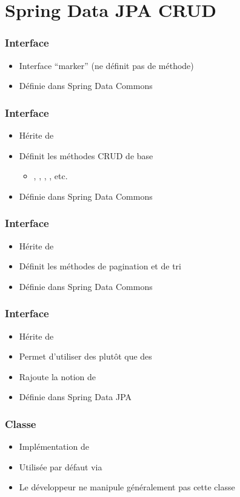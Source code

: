 \section{Spring Data JPA CRUD}



\begin{frame}
 \frametitle{Interface }
 \begin{itemize}
  \item Interface ``marker'' (ne définit pas de méthode)
  \item Définie dans Spring Data Commons
 \end{itemize}

\end{frame}

\begin{frame}
 \frametitle{Interface }
 \begin{itemize}
  \item Hérite de 
  \item Définit les méthodes CRUD de base
  \begin{itemize}
   \item {}, , , , etc.
  \end{itemize}
  \item Définie dans Spring Data Commons
 \end{itemize}

\end{frame}

\begin{frame}
 \frametitle{Interface }
 \begin{itemize}
  \item Hérite de 
  \item Définit les méthodes de pagination et de tri
  \item Définie dans Spring Data Commons
 \end{itemize}

\end{frame}

\begin{frame}
 \frametitle{Interface }
 \begin{itemize}
  \item Hérite de 
  \item Permet d'utiliser des  plutôt que des 
  \item Rajoute la notion de 
  \item Définie dans Spring Data JPA
 \end{itemize}

\end{frame}

\begin{frame}
 \frametitle{Classe }
 \begin{itemize}
  \item Implémentation de 
  \item Utilisée par défaut via 
  \item Le développeur ne manipule généralement pas cette classe
 \end{itemize}

\end{frame}